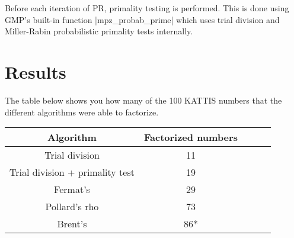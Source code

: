 \documentclass[paper=a4, fontsize=11pt,numbers=endperiod]{scrartcl} %
\numberwithin{equation}{section} %
\numberwithin{figure}{section} %
\numberwithin{table}{section} %
\begin{document}
Before each iteration of PR, primality testing is performed.
This is done using GMP's built-in function |mpz_probab_prime| which uses trial division and Miller-Rabin probabilistic primality tests internally.\cite{probabprime}



\section{Results}

The table below shows you how many of the 100 KATTIS numbers that the different algorithms were able to factorize.

    \begin{tabular}{|c|c|c|c|c|}
    \hline
    \textbf{Algorithm} & \textbf{Factorized numbers} \\ \hline
    Trial division & 11 \\ \hline
    Trial division + primality test & 19 \\ \hline
    Fermat's & 29 \\ \hline
    Pollard's rho & 73 \\ \hline
    Brent's & 86* \\ \hline
    \end{tabular}
    \hspace{10pt}
\end{document}
